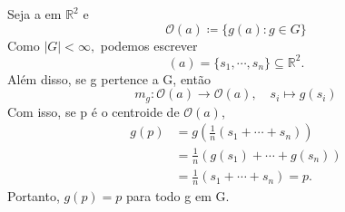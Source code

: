 \documentclass[algebra_notes.tex]{subfiles}
\begin{document}
\begin{proof*}
	Seja a em \(\mathbb{R}^{2}\) e
	\[
		\mathcal{O}(a)\coloneqq \{g(a):g\in G\}
	\]
	Como \(|G| < \infty,\) podemos escrever
	\[
		\mathcal{}(a) = \{s_{1},\cdots, s_{n}\}\subseteq{\mathbb{R}^{2}}.
	\]
	Além disso, se g pertence a G, então
	\[
		m_{g}:\mathcal{O}(a)\rightarrow \mathcal{O}(a), \quad s_{i}\mapsto g(s_{i})
	\]
	Com isso, se p é o centroide de \(\mathcal{O}(a)\),
	\begin{align*}
		g(p) & = g(\frac{1}{n}(s_{1}+\cdots+s_{n}))    \\
		     & = \frac{1}{n}(g(s_{1})+\cdots+g(s_{n})) \\
		     & = \frac{1}{n}(s_{1}+\cdots+s_{n}) = p.
	\end{align*}
	Portanto, \(g(p)=p\) para todo g em G. \qedsymbol
\end{proof*}
\end{document}
